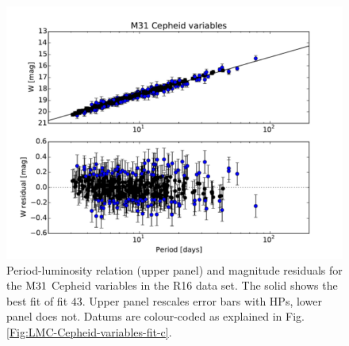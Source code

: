\begin{figure}[hbtp]
\centering
\includegraphics[scale=0.75]{figures/chapter-h0/effective_HP_cepheids_M31_R16.pdf}
\caption{Period-luminosity relation (upper panel) and magnitude residuals for the $\mathrm{M31}$ Cepheid variables in the R16 data set. The solid  shows the best fit of fit $43$. Upper panel rescales error bars with HPs, lower panel does not. Datums are colour-coded as explained in Fig. \ref{Fig:LMC-Cepheid-variables-fit-c}.}
\label{Fig:R16-M31}
\end{figure}

